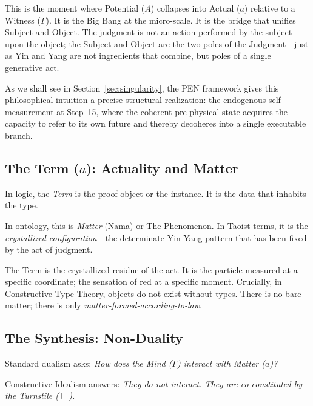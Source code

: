 \documentclass[12pt,a4paper]{article}
\newcommand{\turnstile}{\vdash}
\begin{document}
This is the moment where Potential ($A$) collapses into Actual ($a$) relative to a Witness ($\Gamma$). It is the Big Bang at the micro-scale. It is the bridge that unifies Subject and Object. The judgment is not an action performed by the subject upon the object; the Subject and Object are the two poles of the Judgment---just as Yin and Yang are not ingredients that combine, but poles of a single generative act.

As we shall see in Section~\ref{sec:singularity}, the PEN framework gives this philosophical intuition a precise structural realization: the endogenous self-measurement at Step~15, where the coherent pre-physical state acquires the capacity to refer to its own future and thereby decoheres into a single executable branch.


\subsection{The Term ($a$): Actuality and Matter}
\label{sec:term}

In logic, the \emph{Term} is the proof object or the instance. It is the data that inhabits the type.

In ontology, this is \emph{Matter} (N\=ama) or The Phenomenon. In Taoist terms, it is the \emph{crystallized configuration}---the determinate Yin-Yang pattern that has been fixed by the act of judgment. 

The Term is the crystallized residue of the act. It is the particle measured at a specific coordinate; the sensation of red at a specific moment. Crucially, in Constructive Type Theory, objects do not exist without types. There is no bare matter; there is only \emph{matter-formed-according-to-law}.


\subsection{The Synthesis: Non-Duality}
\label{sec:synthesis}

Standard dualism asks: \emph{How does the Mind ($\Gamma$) interact with Matter ($a$)?}

Constructive Idealism answers: \emph{They do not interact. They are co-constituted by the Turnstile ($\turnstile$).}
\end{document}
